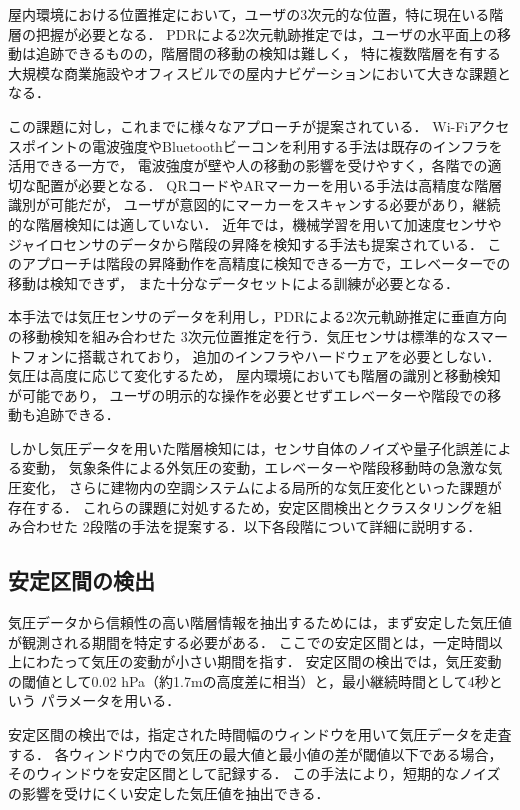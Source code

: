 

屋内環境における位置推定において，ユーザの3次元的な位置，特に現在いる階層の把握が必要となる．
PDRによる2次元軌跡推定では，ユーザの水平面上の移動は追跡できるものの，階層間の移動の検知は難しく，
特に複数階層を有する大規模な商業施設やオフィスビルでの屋内ナビゲーションにおいて大きな課題となる．

この課題に対し，これまでに様々なアプローチが提案されている．
Wi-Fiアクセスポイントの電波強度やBluetoothビーコンを利用する手法は既存のインフラを活用できる一方で，
電波強度が壁や人の移動の影響を受けやすく，各階での適切な配置が必要となる．
QRコードやARマーカーを用いる手法は高精度な階層識別が可能だが，
ユーザが意図的にマーカーをスキャンする必要があり，継続的な階層検知には適していない．
近年では，機械学習を用いて加速度センサやジャイロセンサのデータから階段の昇降を検知する手法も提案されている．
このアプローチは階段の昇降動作を高精度に検知できる一方で，エレベーターでの移動は検知できず，
また十分なデータセットによる訓練が必要となる．

本手法では気圧センサのデータを利用し，PDRによる2次元軌跡推定に垂直方向の移動検知を組み合わせた
3次元位置推定を行う．気圧センサは標準的なスマートフォンに搭載されており，
追加のインフラやハードウェアを必要としない．気圧は高度に応じて変化するため，
屋内環境においても階層の識別と移動検知が可能であり，
ユーザの明示的な操作を必要とせずエレベーターや階段での移動も追跡できる．

しかし気圧データを用いた階層検知には，センサ自体のノイズや量子化誤差による変動，
気象条件による外気圧の変動，エレベーターや階段移動時の急激な気圧変化，
さらに建物内の空調システムによる局所的な気圧変化といった課題が存在する．
これらの課題に対処するため，安定区間検出とクラスタリングを組み合わせた
2段階の手法を提案する．以下各段階について詳細に説明する．


\subsection{安定区間の検出}
気圧データから信頼性の高い階層情報を抽出するためには，まず安定した気圧値が観測される期間を特定する必要がある．
ここでの安定区間とは，一定時間以上にわたって気圧の変動が小さい期間を指す．
安定区間の検出では，気圧変動の閾値として0.02 hPa（約1.7mの高度差に相当）と，最小継続時間として4秒という
パラメータを用いる．

安定区間の検出では，指定された時間幅のウィンドウを用いて気圧データを走査する．
各ウィンドウ内での気圧の最大値と最小値の差が閾値以下である場合，そのウィンドウを安定区間として記録する．
この手法により，短期的なノイズの影響を受けにくい安定した気圧値を抽出できる．


